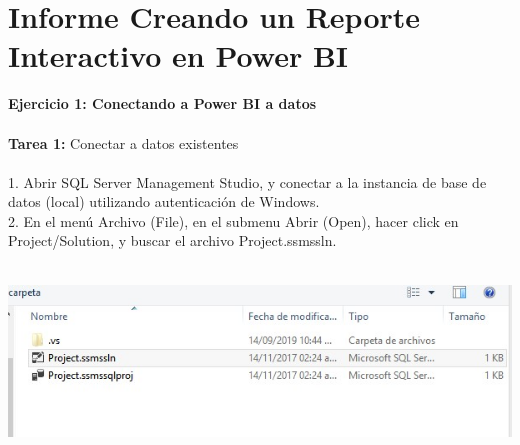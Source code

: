 \section{Informe Creando un Reporte Interactivo en Power BI} 
\begin{flushleft}


\begin{itemize}
\textbf{Ejercicio 1: Conectando a Power BI a datos}\\
\textbf{ }\\
\textbf{Tarea 1: }Conectar a datos existentes \\
\textbf{ }\\

1. Abrir SQL Server Management Studio, y conectar a la instancia de base de datos (local) utilizando
autenticación de Windows.\\
2. En el menú Archivo (File), en el submenu Abrir (Open), hacer click en Project/Solution, y buscar el archivo
Project.ssmssln.\\
\textbf{ }\\
\begin{center}
	\includegraphics[width=15cm]{./Imagenes/image1} 
	\end{center}
\textbf{ }\\



\end{itemize}
\end{flushleft}
